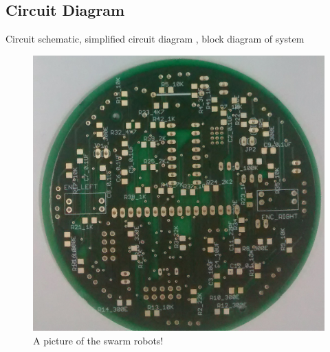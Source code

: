 \documentclass[a4paper,12pt,oneside]{book}
\begin{document}
\subsection*{Circuit Diagram}
Circuit schematic, simplified circuit diagram , block diagram of system
\hfill\\
\begin{figure}[h!]
	\caption{A picture of the swarm robots!}
	\includegraphics[width=\textwidth]{./Pictures/PCB_back}		
\end{figure}	
\hfill\\
\end{document}
